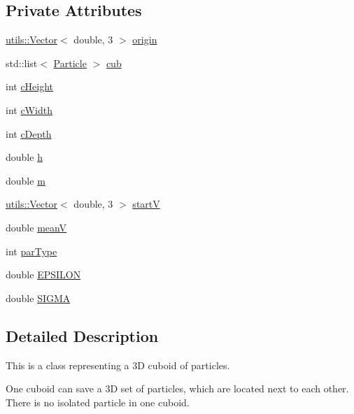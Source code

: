 \subsection*{Private Attributes}
\begin{DoxyCompactItemize}
\item 
\hyperlink{classutils_1_1Vector}{utils\-::\-Vector}$<$ double, 3 $>$ \hyperlink{classCuboid_ab9fea399762342f5636ea69038606ba1}{origin}
\item 
std\-::list$<$ \hyperlink{classParticle}{Particle} $>$ \hyperlink{classCuboid_a46268af723f395a1cb00533cc8dab6c8}{cub}
\item 
int \hyperlink{classCuboid_a774275af1874294d9d12772eaa7d417a}{c\-Height}
\item 
int \hyperlink{classCuboid_a256b9679e10b33f8e280034a6a7de6e8}{c\-Width}
\item 
int \hyperlink{classCuboid_a9f6823cdaa2bbb8df9ea1a8709a3319c}{c\-Depth}
\item 
double \hyperlink{classCuboid_ad5d539f1c69b321fbbe2dcceef65faba}{h}
\item 
double \hyperlink{classCuboid_a98975bdfb1bd4bbb327167d07d1ffdd4}{m}
\item 
\hyperlink{classutils_1_1Vector}{utils\-::\-Vector}$<$ double, 3 $>$ \hyperlink{classCuboid_a7a95bfb80c884e9f96642c9f7043e9e1}{start\-V}
\item 
double \hyperlink{classCuboid_ab6bb8eb2a87d77e67acea088f6a8ba88}{mean\-V}
\item 
int \hyperlink{classCuboid_acd3e5d96f6da99b24468ee9673f9daba}{par\-Type}
\item 
double \hyperlink{classCuboid_a3925eb122d69d5938939945a961dc96f}{E\-P\-S\-I\-L\-O\-N}
\item 
double \hyperlink{classCuboid_a88c7ddda07e9eb992c8b549ca1f6e827}{S\-I\-G\-M\-A}
\end{DoxyCompactItemize}


\subsection{Detailed Description}
This is a class representing a 3\-D cuboid of particles. 

One cuboid can save a 3\-D set of particles, which are located next to each other. There is no isolated particle in one cuboid. 


